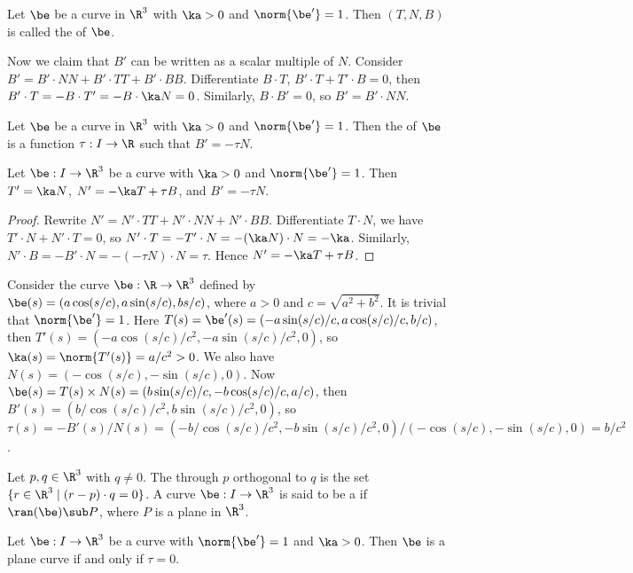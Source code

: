 \documentclass[10pt]{article}
\begin{document}
\begin{definition}
    Let $\be$ be a curve in ${\R}^{3}$ with $\ka>0$ and $\norm{\be'}=1$. Then $(T,N,B)$ is called the  of $\be$.
\end{definition}
\par
Now we claim that $B'$ can be written as a scalar multiple of $N$. Consider $B'=B'\cdot NN+B'\cdot TT+B'\cdot BB$. Differentiate $B\cdot T$, $B'\cdot T+T'\cdot B=0$, then $B'\cdot T=-B\cdot T'=-B\cdot\ka N=0$. Similarly, $B\cdot B'=0$, so $B'=B'\cdot NN$.
\begin{definition}
    Let $\be$ be a curve in ${\R}^{3}$ with $\ka>0$ and $\norm{\be'}=1$. Then the  of $\be$ is a function $\tau:I\to\R$ such that $B'=-\tau N$.
\end{definition}
\begin{theorem}
    Let $\be:I\to{\R}^{3}$ be a curve with $\ka>0$ and $\norm{\be'}=1$. Then $T'=\ka N$, $N'=-\ka T+\tau B$, and $B'=-\tau N$.
\end{theorem}
\begin{proof}
    Rewrite $N'=N'\cdot TT+N'\cdot NN+N'\cdot BB$. Differentiate $T\cdot N$, we have $T'\cdot N+N'\cdot T=0$, so $N'\cdot T=-T'\cdot N=-(\ka N)\cdot N=-\ka$. Similarly, $N'\cdot B=-B'\cdot N=-(-\tau N)\cdot N=\tau$. Hence $N'=-\ka T+\tau B$.
\end{proof}
\begin{example}
    Consider the curve $\be:\R\to{\R}^{3}$ defined by $\be(s)=(a\cos(s/c),a\sin(s/c),bs/c)$, where $a>0$ and $c=\sqrt{{a}^{2}+{b}^{2}}$. It is trivial that $\norm{\be'}=1$. Here $T(s)=\be'(s)=(-a\sin(s/c)/c,a\cos(s/c)/c,b/c)$, then $T'(s)=(-a\cos(s/c)/{c}^{2},-a\sin(s/c)/{c}^{2},0)$, so $\ka(s)=\norm{T'(s)}=a/{c}^{2}>0$. We also have $N(s)=(-\cos(s/c),-\sin(s/c),0)$. Now $\be(s)=T(s)\times N(s)=(b\sin(s/c)/c,-b\cos(s/c)/c,a/c)$, then $B'(s)=(b/\cos(s/c)/{c}^{2},b\sin(s/c)/{c}^{2},0)$, so $\tau(s)=-B'(s)/N(s)=(-b/\cos(s/c)/{c}^{2},-b\sin(s/c)/{c}^{2},0)/(-\cos(s/c),-\sin(s/c),0)=b/{c}^{2}$.
\end{example}
\begin{definition}
    Let $p,q\in{\R}^{3}$ with $q\ne 0$. The  through $p$ orthogonal to $q$ is the set $\{r\in{\R}^{3}\mid(r-p)\cdot q=0\}$. A curve $\be:I\to{\R}^{3}$ is said to be a  if $\ran(\be)\sub P$, where $P$ is a plane in ${\R}^{3}$.
\end{definition}
\begin{proposition}
    Let $\be:I\to{\R}^{3}$ be a curve with $\norm{\be'}=1$ and $\ka>0$. Then $\be$ is a plane curve if and only if $\tau=0$. 
\end{proposition}
\end{document}
